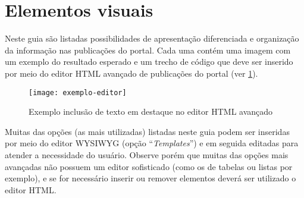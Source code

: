 \section{Elementos visuais}\label{RS0001:styles}

Neste guia são listadas possibilidades de apresentação diferenciada e organização da informação nas publicações do portal. Cada uma contém uma imagem com um exemplo do resultado esperado e um trecho de código que deve ser inserido por meio do editor HTML avançado de publicações do portal (ver \cref{RS0001:fig:exemplo-editor}).

\begin{figure}[!ht]
    \centering
    \texttt{[image: exemplo-editor]}
    \caption{Exemplo inclusão de texto em destaque no editor HTML avançado}\label{RS0001:fig:exemplo-editor}
\end{figure}

Muitas das opções (as mais utilizadas) listadas neste guia podem ser inseridas por meio do editor \gls{WYSIWYG} (opção ``\textit{Templates}'') e em seguida editadas para atender a necessidade do usuário. Observe porém que muitas das opções mais avançadas não possuem um editor sofisticado (como os de tabelas ou listas por exemplo), e se for necessário inserir ou remover elementos deverá ser utilizado o editor \gls{HTML}.







